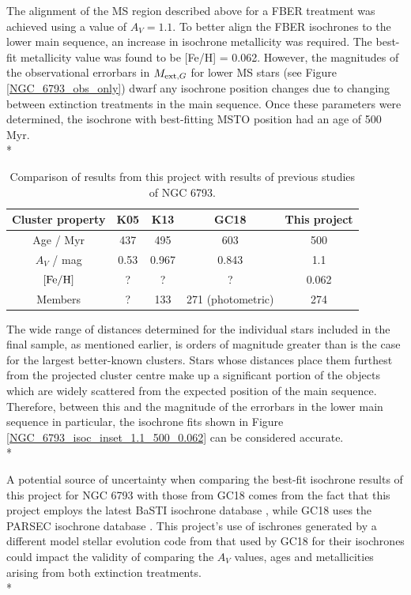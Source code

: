 \documentclass[12pt, a4paper]{report}
\begin{document}
The alignment of the MS region described above for a FBER treatment was achieved using a value of $A_{V} = 1.1$. To better align the FBER isochrones to the lower main sequence, an increase in isochrone metallicity was required. The best-fit metallicity value was found to be [Fe/H] = 0.062. However, the magnitudes of the observational errorbars in $M_{\textnormal{ext},G}$ for lower MS stars (see Figure \ref{NGC_6793_obs_only}) dwarf any isochrone position changes due to changing between extinction treatments in the main sequence. Once these parameters were determined, the isochrone with best-fitting MSTO position had an age of 500 Myr.\\*


\begin{table}
\begin{center}
\begin{tabular}{ccccc}
\hline
Cluster property & K05 & K13 & GC18 & This project \\
\hline
Age / Myr & 437 & 495 & 603 & 500 \\
$A_{V}$ / mag & 0.53 & 0.967 & 0.843 & 1.1 \\
$\textnormal{[Fe/H]}$ & ? & ? & ? & 0.062 \\
Members & ? & 133 & 271 (photometric) & 274 \\
\hline
\end{tabular}
\caption{Comparison of results from this project with results of previous studies of NGC 6793.}
\label{NGC6793_result}
\end{center}
\end{table}

The wide range of distances determined for the individual stars included in the final sample, as mentioned earlier, is orders of magnitude greater than is the case for the largest better-known clusters. Stars whose distances place them furthest from the projected cluster centre make up a significant portion of the objects which are widely scattered from the expected position of the main sequence. Therefore, between this and the magnitude of the errorbars in the lower main sequence in particular, the isochrone fits shown in Figure \ref{NGC_6793_isoc_inset_1.1_500_0.062} can be considered accurate. \\*

A potential source of uncertainty when comparing the best-fit isochrone results of this project for NGC 6793 with those from GC18 comes from the fact that this project employs the latest BaSTI isochrone database \citep{2018ApJ...856..125H}, while GC18 uses the PARSEC isochrone database \citep{2017ApJ...835...77M}. This project's use of ischrones generated by a different model stellar evolution code from that used by GC18 for their isochrones could impact the validity of comparing the $A_{V}$ values, ages and metallicities arising from both extinction treatments.\\*
\end{document}
